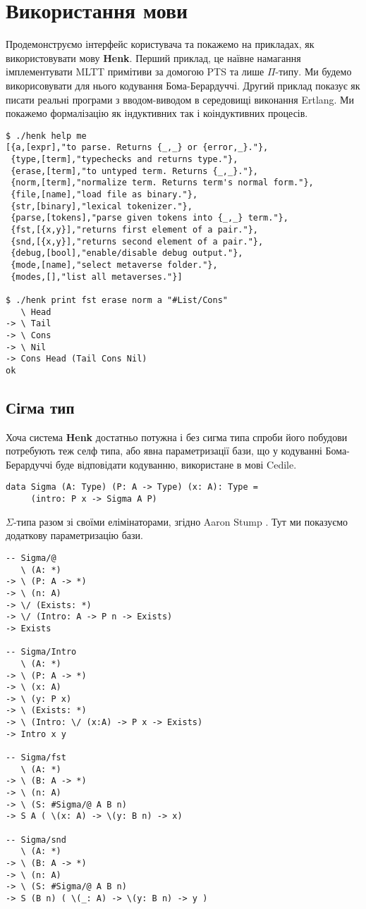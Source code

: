 \documentclass{article}
\begin{document}
\section{Використання мови}

Продемонструємо інтерфейс користувача та покажемо на прикладах, як використовувати мову \textbf{Henk}.
Перший приклад, це наївне намагання імплементувати MLTT примітиви за домогою PTS та лише $\Pi$-типу. Ми будемо
викорисовувати для нього кодування Бома-Берардуччі\cite{Bohm85}. Другий приклад показує як писати реальні програми
з вводом-виводом в середовищі виконання Ertlang. Ми покажемо формалізацію як індуктивних так і коіндуктивних процесів.

\begin{lstlisting}
$ ./henk help me
[{a,[expr],"to parse. Returns {_,_} or {error,_}."},
 {type,[term],"typechecks and returns type."},
 {erase,[term],"to untyped term. Returns {_,_}."},
 {norm,[term],"normalize term. Returns term's normal form."},
 {file,[name],"load file as binary."},
 {str,[binary],"lexical tokenizer."},
 {parse,[tokens],"parse given tokens into {_,_} term."},
 {fst,[{x,y}],"returns first element of a pair."},
 {snd,[{x,y}],"returns second element of a pair."},
 {debug,[bool],"enable/disable debug output."},
 {mode,[name],"select metaverse folder."},
 {modes,[],"list all metaverses."}]

$ ./henk print fst erase norm a "#List/Cons"
   \ Head
-> \ Tail
-> \ Cons
-> \ Nil
-> Cons Head (Tail Cons Nil)
ok
\end{lstlisting}

\subsection{Сігма тип}
Хоча система \textbf{Henk} достатньо потужна і без сигма типа спроби його побудови потребують теж селф типа, або явна параметризації бази,
що у кодуванні Бома-Берардуччі буде відповідати кодуванню, використане в мові Cedile.

\begin{lstlisting}
data Sigma (A: Type) (P: A -> Type) (x: A): Type =
     (intro: P x -> Sigma A P)
\end{lstlisting}

{\bf $\Sigma$}-типа разом зі своїми елімінаторами, згідно Aaron Stump \cite{Stump17}.
Тут ми показуємо додаткову параметризацію бази.

\begin{lstlisting}
-- Sigma/@
   \ (A: *)
-> \ (P: A -> *)
-> \ (n: A)
-> \/ (Exists: *)
-> \/ (Intro: A -> P n -> Exists)
-> Exists

-- Sigma/Intro
   \ (A: *)
-> \ (P: A -> *)
-> \ (x: A)
-> \ (y: P x)
-> \ (Exists: *)
-> \ (Intro: \/ (x:A) -> P x -> Exists)
-> Intro x y

-- Sigma/fst
   \ (A: *)
-> \ (B: A -> *)
-> \ (n: A)
-> \ (S: #Sigma/@ A B n)
-> S A ( \(x: A) -> \(y: B n) -> x)

-- Sigma/snd
   \ (A: *)
-> \ (B: A -> *)
-> \ (n: A)
-> \ (S: #Sigma/@ A B n)
-> S (B n) ( \(_: A) -> \(y: B n) -> y )
\end{lstlisting}
\end{document}
